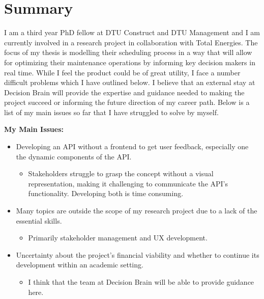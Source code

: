 \section{Summary}
I am a third year PhD fellow at DTU Construct and DTU Management and I am currently involved in a research project in collaboration with Total Energies. The focus of my thesis is modelling 
their scheduling process in a way that will allow for optimizing their maintenance operations by informing key decision makers in real time. While I feel
the product could be of great utility, I face a number difficult problems which I have outlined below. I believe that an external stay at Decision Brain will provide the 
expertise and guidance needed to making the project succeed or informing the future direction of my career path. 
Below is a list of my main issues so far that I have struggled to solve by myself. 

\textbf{My Main Issues:}
\begin{itemize}
	\item Developing an API without a frontend to get user feedback, especially one the dynamic components of the API.
	\begin{itemize}
		\item Stakeholders struggle to grasp the concept without a visual representation, making it challenging to communicate the API's functionality. Developing both is time consuming.
	\end{itemize}
	\item Many topics are outside the scope of my research project due to a lack of the essential skills. 
	\begin{itemize}
		\item Primarily stakeholder management and UX development.
	\end{itemize}
	\item Uncertainty about the project's financial viability and whether to continue its development within an academic setting.
	\begin{itemize}
		\item I think that the team at Decision Brain will be able to provide guidance here.
	\end{itemize}
\end{itemize}

